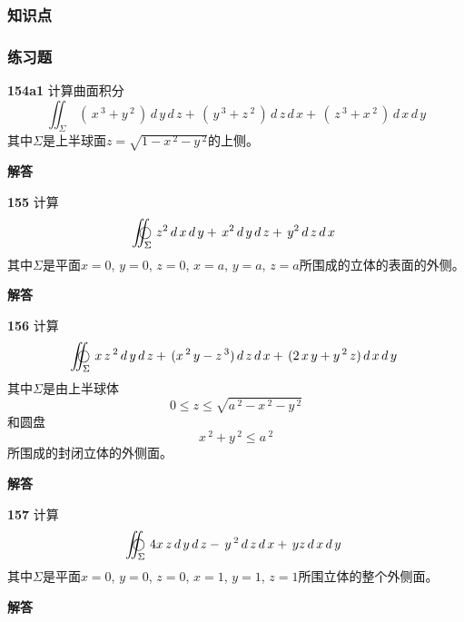 \documentclass[a4paper,10pt]{article} %
\newcommand{\oiint}{\,\bigcirc\kern -17.3pt\int\kern -7.5pt\int}
\begin{document}
\subsubsection{知识点}
\subsubsection{练习题}
\par\noindent \textbf{154a1} \quad 计算曲面积分
$$\iint_{\Sigma} \,\left(\,x\,^3+y\,^2\,\right)\,d\,y\,d\,z+\,\left(\,y\,^3+z\,^2\,\right)\,d\,z\,d\,x+\,\left(\,z\,^3+x\,^2\,\right)\,d\,x\,d\,y$$
其中$\Sigma$是上半球面$z=\sqrt{1-x\,^2-y\,^2}$的上侧。
\par\noindent \textbf{ 解答}




\textheight


\par\noindent \textbf{155} \quad 计算
$$\oiint_{\Sigma} \,z^2\,d\,x\,d\,y+\,x^2\,d\,y\,d\,z+\,y^2\,d\,z\,d\,x$$
其中$\Sigma$是平面$x=0$, $y=0$, $z=0$, $x=a$, $y=a$, $z=a$所围成的立体的表面的外侧。
\par\noindent \textbf{ 解答}




\textheight


\par\noindent \textbf{156} \quad 计算
$$\oiint_{\Sigma} \,x\,z\,^2\,d\,y\,d\,z+\,(x\,^2\,y-z\,^3)\,d\,z\,d\,x+\,(2\,x\,y+y\,^2\,z)\,d\,x\,d\,y$$
其中$\Sigma$是由上半球体
$$0\leq z\leq \sqrt{a\,^2-x\,^2-y\,^2}$$
和圆盘
$$x\,^2+y\,^2\leq a\,^2$$
所围成的封闭立体的外侧面。
\par\noindent \textbf{ 解答}




\textheight


\par\noindent \textbf{157} \quad 计算
$$\oiint_{\Sigma} \,4x\,z\,d\,y\,d\,z-\,y\,^2\,d\,z\,d\,x+\,yz\,d\,x\,d\,y$$
其中$\Sigma$是平面$x=0$, $y=0$, $z=0$, $x=1$, $y=1$, $z=1$所围立体的整个外侧面。
\par\noindent \textbf{ 解答}
\end{document}
